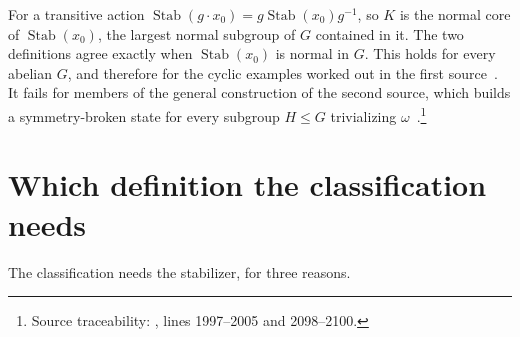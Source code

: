 \documentclass{article}
\begin{document}
For a transitive action $\operatorname{Stab}(g\cdot x_0)=g\operatorname{Stab}(x_0)g^{-1}$,
so $K$ is the normal core of $\operatorname{Stab}(x_0)$, the largest normal
subgroup of $G$ contained in it. The two definitions agree exactly when
$\operatorname{Stab}(x_0)$ is normal in $G$. This holds for every abelian $G$,
and therefore for the cyclic examples worked out in the first
source~\cite{GarreRubioSchuch2024DomainWall}. It
fails for members of the general construction of the second source, which
builds a symmetry-broken state for every subgroup $H\leq G$ trivializing
$\omega$~\cite{GarreRubio2023MPOSym}.\footnote{Source traceability:
    , lines 1997--2005 and
    2098--2100.}

\section{Which definition the classification needs}

The classification needs the stabilizer, for three reasons.
\end{document}
